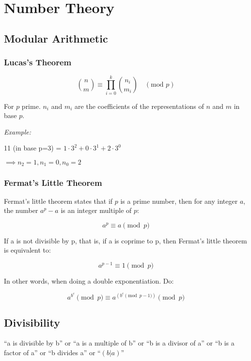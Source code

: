 \chapter{Number Theory}

\section{Modular Arithmetic}


	\subsection{Lucas's Theorem}

	$$ \binom{n}{m} \equiv \prod_{i=0}^k \binom{n_i}{m_i} \quad (\text{mod } p) $$ 

	For $p$ prime. $n_i$ and $m_i$ are the coefficients of the representations of $n$ and $m$ in base $p$.

	\textit{Example:}

		11 (in base p=3) = $1 \cdot 3^2 + 0 \cdot 3^1 + 2 \cdot 3^0$

		$\implies n_2 = 1, n_1 = 0, n_0 = 2$

\subsection{Fermat's Little Theorem}

Fermat's little theorem states that if $p$ is a prime number, then for any integer $a$, the number $a^p - a$ is an integer multiple of $p$:

$$ a^{p} \equiv a {\pmod {p}} $$

If a is not divisible by p, that is, if a is coprime to p, then Fermat's little theorem is equivalent to:

$$ a^{p-1} \equiv 1 {\pmod {p}} $$

In other words, when doing a double exponentiation. Do:

$$ a^{b^c} {\pmod {p}} \equiv a^{ ({b^c} {\pmod {p-1}}) } {\pmod {p}} $$

\section{Divisibility}

    ``a is divisible by b'' or
    ``a is a multiple of b'' or
    ``b is a divisor of a'' or
    ``b is a factor of a'' or
    ``b divides a'' or
    ``$(b | a)$''

